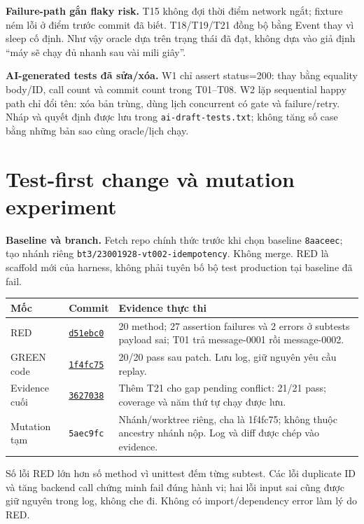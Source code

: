 \documentclass[11pt,a4paper]{article}
\DeclareRobustCommand{\code}[1]{\nolinkurl{#1}}
\newcommand{\Repo}{https://github.com/doandinhlinh25/thanh-tam-tam-linh}
\newcommand{\Red}{d51ebc03bd747a35a428dc40cf6d491541fcdcbf}
\newcommand{\Green}{1f4fc75c153864d4bec4e544c65761133b4b306a}
\newcommand{\Evidence}{362703817e2d01a7915a076b954fcbf3038771b5}
\begin{document}
\textbf{Failure-path gắn flaky risk.} T15 không đợi thời điểm network ngắt; fixture ném lỗi ở điểm trước commit đã biết. T18/T19/T21 đồng bộ bằng Event thay vì sleep cố định. Như vậy oracle dựa trên trạng thái đã đạt, không dựa vào giả định ``máy sẽ chạy đủ nhanh sau vài mili giây''.

\textbf{AI-generated tests đã sửa/xóa.} W1 chỉ assert status=200: thay bằng equality body/ID, call count và commit count trong T01--T08. W2 lặp sequential happy path chỉ đổi tên: xóa bản trùng, dùng lịch concurrent có gate và failure/retry. Nháp và quyết định được lưu trong \code{ai-draft-tests.txt}; không tăng số case bằng những bản sao cùng oracle/lịch chạy.

\newpage
\section{Test-first change và mutation experiment}
\textbf{Baseline và branch.} Fetch repo chính thức trước khi chọn baseline \code{8aaceec}; tạo nhánh riêng \code{bt3/23001928-vt002-idempotency}. Không merge. RED là scaffold mới của harness, không phải tuyên bố bộ test production tại baseline đã fail.

\begin{tabular}{@{}L{22mm}L{27mm}L{\dimexpr\textwidth-49mm-4\tabcolsep\relax}@{}}
\toprule
\textbf{Mốc} & \textbf{Commit} & \textbf{Evidence thực thi}\\\midrule
RED & \href{\Repo/commit/\Red}{\code{d51ebc0}} & 20 method; 27 assertion failures và 2 errors ở subtests payload sai; T01 trả message-0001 rồi message-0002.\\[3pt]
GREEN code & \href{\Repo/commit/\Green}{\code{1f4fc75}} & 20/20 pass sau patch. Lưu log, giữ nguyên yêu cầu replay.\\[3pt]
Evidence cuối & \href{\Repo/commit/\Evidence}{\code{3627038}} & Thêm T21 cho gap pending conflict: 21/21 pass; coverage và năm thứ tự chạy được lưu.\\[3pt]
Mutation tạm & \code{5aec9fc} & Nhánh/worktree riêng, cha là 1f4fc75; không thuộc ancestry nhánh nộp. Log và diff được chép vào evidence.\\
\bottomrule
\end{tabular}
Số lỗi RED lớn hơn số method vì unittest đếm từng subtest. Các lỗi duplicate ID và tăng backend call chứng minh fail đúng hành vi; hai lỗi input sai cũng được giữ nguyên trong log, không che đi. Không có import/dependency error làm lý do RED.
\end{document}
